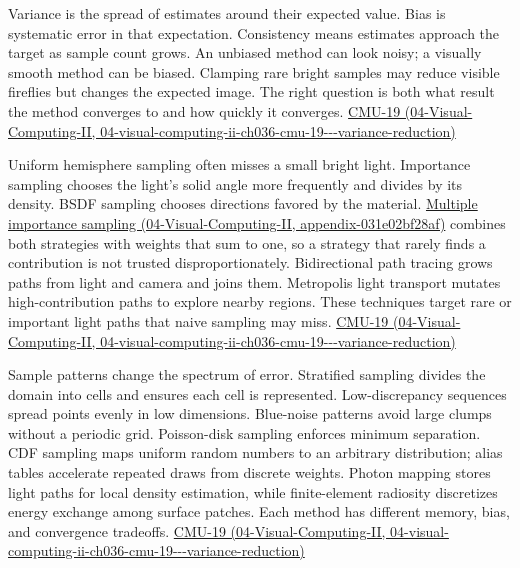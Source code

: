 Variance is the spread of estimates around their expected value. Bias is systematic error in that expectation. Consistency means estimates approach the target as sample count grows. An unbiased method can look noisy; a visually smooth method can be biased. Clamping rare bright samples may reduce visible fireflies but changes the expected image. The right question is both what result the method converges to and how quickly it converges. \href{../04-Visual-Computing-II/main.pdf\#nameddest=04-visual-computing-ii-ch036-cmu-19---variance-reduction}{CMU-19 (04-Visual-Computing-II, 04-visual-computing-ii-ch036-cmu-19-\/-\/-variance-reduction)}

Uniform hemisphere sampling often misses a small bright light. Importance sampling chooses the light's solid angle more frequently and divides by its density. BSDF sampling chooses directions favored by the material. \href{../04-Visual-Computing-II/main.pdf\#nameddest=appendix-031e02bf28af}{Multiple importance sampling (04-Visual-Computing-II, appendix-031e02bf28af)} combines both strategies with weights that sum to one, so a strategy that rarely finds a contribution is not trusted disproportionately. Bidirectional path tracing grows paths from light and camera and joins them. Metropolis light transport mutates high-contribution paths to explore nearby regions. These techniques target rare or important light paths that naive sampling may miss. \href{../04-Visual-Computing-II/main.pdf\#nameddest=04-visual-computing-ii-ch036-cmu-19---variance-reduction}{CMU-19 (04-Visual-Computing-II, 04-visual-computing-ii-ch036-cmu-19-\/-\/-variance-reduction)}

Sample patterns change the spectrum of error. Stratified sampling divides the domain into cells and ensures each cell is represented. Low-discrepancy sequences spread points evenly in low dimensions. Blue-noise patterns avoid large clumps without a periodic grid. Poisson-disk sampling enforces minimum separation. CDF sampling maps uniform random numbers to an arbitrary distribution; alias tables accelerate repeated draws from discrete weights. Photon mapping stores light paths for local density estimation, while finite-element radiosity discretizes energy exchange among surface patches. Each method has different memory, bias, and convergence tradeoffs. \href{../04-Visual-Computing-II/main.pdf\#nameddest=04-visual-computing-ii-ch036-cmu-19---variance-reduction}{CMU-19 (04-Visual-Computing-II, 04-visual-computing-ii-ch036-cmu-19-\/-\/-variance-reduction)}

